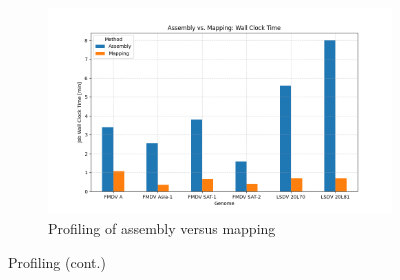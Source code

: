 \begin{figure}[ht]\ContinuedFloat
    \centering
	\begin{subfigure}[b]{1.1\textwidth}
        \includegraphics[width=1.0\textwidth]{media/4-profiling-wallclock.png}
        \caption{Profiling of assembly versus mapping }
        \label{fig:4-profiling-wallclock}
    \end{subfigure}
    \caption{Profiling (cont.)}
    \label{fig:4-profiling}
\end{figure}

